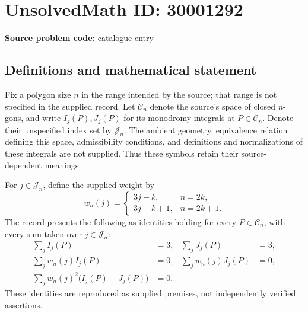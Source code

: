 \documentclass[11pt]{article}
\begin{document}
\section*{UnsolvedMath ID: 30001292}
\textbf{Source problem code:} catalogue entry
\subsection{Definitions and mathematical statement}
Fix a polygon size \(n\) in the range intended by the source; that range is not specified in the supplied record. Let \(\mathcal C_n\) denote the source's space of closed \(n\)-gons, and write \(I_j(P),J_j(P)\) for its monodromy integrals at \(P\in\mathcal C_n\). Denote their unspecified index set by \(\mathcal J_n\). The ambient geometry, equivalence relation defining this space, admissibility conditions, and definitions and normalizations of these integrals are not supplied. Thus these symbols retain their source-dependent meanings.

For \(j\in\mathcal J_n\), define the supplied weight by
\[
 w_n(j)=
 \begin{cases}
 3j-k,&n=2k,\\
 3j-k+1,&n=2k+1.
 \end{cases}
\]
The record presents the following as identities holding for every \(P\in\mathcal C_n\), with every sum taken over \(j\in\mathcal J_n\):
\[
\begin{aligned}
 \sum_j I_j(P)&=3,&\sum_j J_j(P)&=3,\\
 \sum_j w_n(j)I_j(P)&=0,&\sum_j w_n(j)J_j(P)&=0,\\
 \sum_j w_n(j)^2\bigl(I_j(P)-J_j(P)\bigr)&=0.
\end{aligned}
\]
These identities are reproduced as supplied premises, not independently verified assertions.
\end{document}
